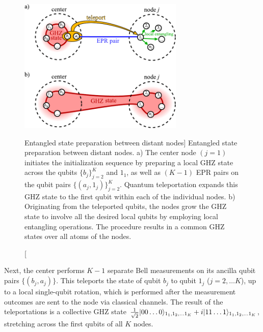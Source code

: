 \begin{figure}
\centering
\includegraphics[width=0.7\textwidth]{./figs_Komar2014/fig2.pdf}
\caption
[Entangled state preparation between distant nodes]
{
\label{fig:entangling}
Entangled state preparation between distant nodes.
a) The center node $(j=1)$ initiates the initialization sequence by preparing a
local GHZ state across the qubits $\{b_j\}_{j=2}^K$ and $1_1$, as well as $(K-1)$ EPR pairs on
the qubit pairs $\{(a_j,1_j)\}_{j=2}^K$.
Quantum teleportation expands this GHZ state to the first qubit within each of
the individual nodes.
b) Originating from the teleported qubits, the nodes grow the GHZ state to
involve all the desired local qubits by employing local entangling
operations.
The procedure results in a common GHZ states over all atoms of the nodes.
 }
\end{figure}


Next, the center performs $K-1$ separate Bell measurements on
 its ancilla qubit pairs $\{(b_j, a_j)\}$. This teleports the state of qubit $b_j$ to
 qubit $1_j$
($j=2,\dots K$), up to a local single-qubit rotation, which is performed
after the measurement outcomes are sent to the node via classical channels.
The result of the  teleportations is a collective GHZ state
$\frac{1}{\sqrt{2}}| 00\dots 0 \rangle_{1_1,1_2,\dots 1_K} + i | 11\dots
1 \rangle_{1_1,1_2,\dots 1_K}$, stretching across the first qubits of all $K$ nodes.

